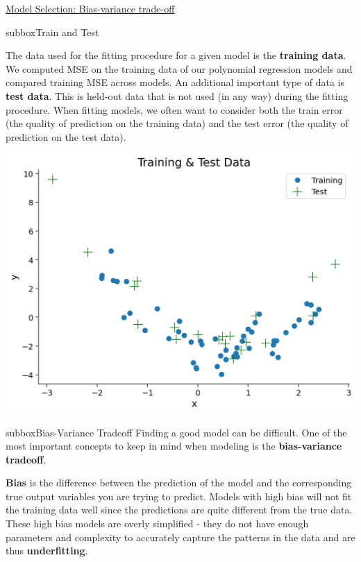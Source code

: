 \begin{textbox}{\href{https://compneuro.neuromatch.io/tutorials/W1D2_ModelFitting/student/W1D2_Tutorial5.html}{Model Selection: Bias-variance trade-off }  }
\begin{subbox}{subbox}{Train and Test}
\scriptsize

 The data used for the fitting procedure for a given model is the \textbf{training data}. We computed MSE on the training data of our polynomial regression models and compared training MSE across models. An additional important type of data is \textbf{test data}. This is held-out data that is not used (in any way) during the fitting procedure. When fitting models, we often want to consider both the train error (the quality of prediction on the training data) and the test error (the quality of prediction on the test data).
 
\centering
\includegraphics[scale=0.2]{Figures/ModelFitting/MFFigure5.png}
\end{subbox}
\begin{subbox}{subbox}{Bias-Variance Tradeoff}
\scriptsize
Finding a good model can be difficult. One of the most important concepts to keep in mind when modeling is the \textbf{bias-variance tradeoff}. 

\textbf{Bias} is the difference between the prediction of the model and the corresponding true output variables you are trying to predict. Models with high bias will not fit the training data well since the predictions are quite different from the true data. These high bias models are overly simplified - they do not have enough parameters and complexity to accurately capture the patterns in the data and are thus \textbf{underfitting}.



\end{subbox}
\end{textbox}
